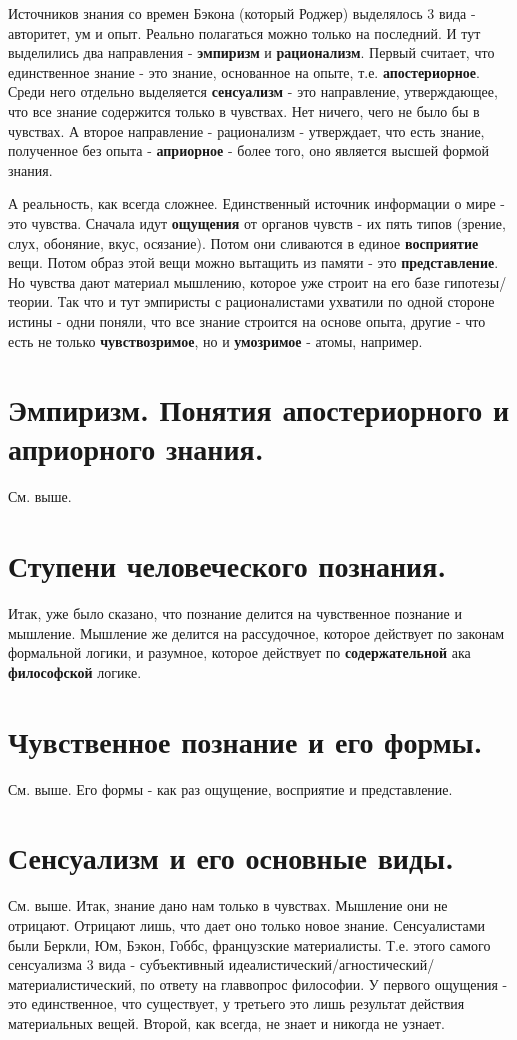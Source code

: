 Источников знания со времен Бэкона (который Роджер) выделялось 3 вида - авторитет, ум и опыт. Реально полагаться можно только на последний. И тут выделились два направления - \textbf{эмпиризм} и \textbf{рационализм}. Первый считает, что единственное знание - это знание, основанное на опыте, т.е. \textbf{апостериорное}. Среди него отдельно выделяется \textbf{сенсуализм} - это направление, утверждающее, что все знание содержится только в чувствах. Нет ничего, чего не было бы в чувствах. А второе направление - рационализм - утверждает, что есть знание, полученное без опыта - \textbf{априорное} - более того, оно является высшей формой знания.

А реальность, как всегда сложнее. Единственный источник информации о мире - это чувства. Сначала идут \textbf{ощущения} от органов чувств - их пять типов (зрение, слух, обоняние, вкус, осязание). Потом они сливаются в единое \textbf{восприятие} вещи. Потом образ этой вещи можно вытащить из памяти - это \textbf{представление}. Но чувства дают материал мышлению, которое уже строит на его базе гипотезы/теории. Так что и тут эмпиристы с рационалистами ухватили по одной стороне истины - одни поняли, что все знание строится на основе опыта, другие - что есть не только \textbf{чувствозримое}, но и \textbf{умозримое} - атомы, например.

\section{ Эмпиризм. Понятия апостериорного и априорного знания.}
См. выше.

\section{ Ступени человеческого познания.}
Итак, уже было сказано, что познание делится на чувственное познание и мышление. Мышление же делится на рассудочное, которое действует по законам формальной логики, и разумное, которое действует по \textbf{содержательной} ака \textbf{философской} логике.

\section{ Чувственное познание и его формы.}
См. выше. Его формы - как раз ощущение, восприятие и представление.

\section{ Сенсуализм и его основные виды.}
См. выше. Итак, знание дано нам только в чувствах. Мышление они не отрицают. Отрицают лишь, что дает оно только новое знание. Сенсуалистами были Беркли, Юм, Бэкон, Гоббс, французские материалисты.  Т.е. этого самого сенсуализма 3 вида - субъективный идеалистический/агностический/материалистический, по ответу на главвопрос философии. У первого ощущения - это единственное, что существует, у третьего это лишь результат действия материальных вещей. Второй, как всегда, не знает и никогда не узнает.

